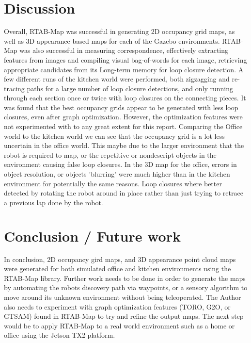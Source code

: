 \documentclass[10pt,journal,compsoc]{IEEEtran}
\begin{document}
\section{Discussion}
\label{sec:discussion}
Overall, RTAB-Map was successful in generating 2D occupancy grid maps, as well as 3D appearance based maps for each of the Gazebo environments. RTAB-Map was also successful in measuring correspondence, effectively extracting features from images and compiling visual bag-of-words for each image, retrieving appropriate candidates from its Long-term memory for loop closure detection. A few different runs of the kitchen world were performed, both zigzagging and re-tracing paths for a large number of loop closure detections, and only running through each section once or twice with loop closures on the connecting pieces. It was found that the best occupancy grids appear to be generated with less loop closures, even after graph optimization. However, the optimization features were not experimented with to any great extent for this report. Comparing the Office world to the kitchen world we can see that the occupancy grid is a lot less uncertain in the office world. This maybe due to the larger environment that the robot is required to map, or the repetitive or nondescript objects in the environment causing false loop closures. In the 3D map for the office, errors in object resolution, or objects 'blurring' were much higher than in the kitchen environment for potentially the same reasons. Loop closures where better detected by rotating the robot around in place rather than just trying to retrace a previous lap done by the robot.


\section{Conclusion / Future work}
\label{sec:conclusion}

In conclusion, 2D occupancy gird maps, and 3D appearance point cloud maps were generated for both simulated office and kitchen environments using the RTAB-Map library. Further work needs to be done in order to generate the maps by automating the robots discovery path via waypoints, or a sensory algorithm to move around its unknown environment without being teleoperated. The Author also needs to experiment with graph optimization features (TORO, G2O, or GTSAM) found in RTAB-Map to try and refine the output maps. The next step would be to apply RTAB-Map to a real world environment such as a home or office using the Jetson TX2 platform.




\end{document}
